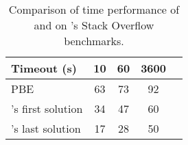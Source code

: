 \begin{table}[t]
\centering
\setlength{\tabcolsep}{2ex}
\caption{Comparison of time performance of \Regel{} and \Forest{} on \Regel{}'s Stack Overflow benchmarks.}
\begin{tabular}{@{}lcccc@{}}
\toprule
\textbf{Timeout (s)} & \textbf{10} & \textbf{60} & \textbf{3600} \\ \midrule
\Regel{} PBE               & 63 & 73 & 92 \\
\Forest{}'s first solution & 34 & 47 & 60 \\
\Forest{}'s last solution  & 17 & 28 & 50 \\ \bottomrule
\end{tabular}
\label{table:number-solved-resnax}
\vspace*{-2mm}
\end{table}
